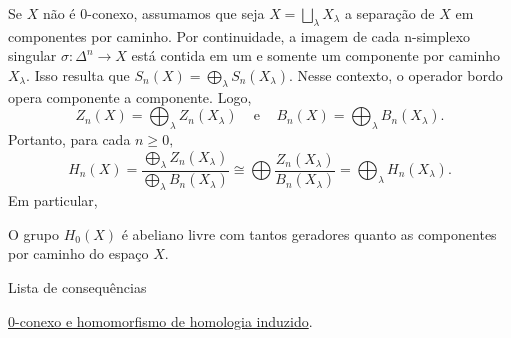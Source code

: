 Se $X$ não é 0-conexo, assumamos que seja $X=\bigsqcup_\lambda X_\lambda$ a separação de $X$ em componentes por caminho. Por continuidade, a imagem de cada n-simplexo singular $\sigma:\Delta^n\rightarrow X$ está contida em um e somente um componente por caminho $X_\lambda$. Isso resulta que $S_n(X)=\bigoplus_\lambda S_n(X_\lambda)$. Nesse contexto, o operador bordo opera componente a componente. Logo, 
\[Z_n(X)=\bigoplus_\lambda Z_n(X_\lambda)\;\;\;\text{ e }\;\;\;B_n(X)=\bigoplus_\lambda B_n(X_\lambda).\] 
Portanto, para cada $n\ge 0,$
\[H_n(X)=\frac{\bigoplus_\lambda Z_n(X_\lambda)}{\bigoplus_\lambda B_n(X_\lambda)}\cong\bigoplus\frac{Z_n(X_\lambda)}{B_n(X_\lambda)}=\bigoplus_\lambda H_n(X_\lambda
).\]
Em particular, 
\begin{corol}
    O grupo $H_0(X)$ é abeliano livre com tantos geradores quanto as componentes por caminho do espaço $X$.
\end{corol}

\begin{titlemize}{Lista de consequências}
    \item \hyperref[0-conexo-e-homomorfismo-de-homologia-induzido-prop]{0-conexo e homomorfismo de homologia induzido}.\\
\end{titlemize}
